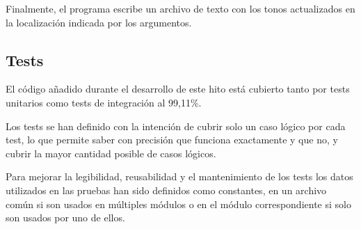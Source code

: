 Finalmente, el programa escribe un archivo de texto con los tonos actualizados en la localización indicada por los argumentos.

\subsection{Tests}

El código añadido durante el desarrollo de este hito está cubierto tanto por tests unitarios como tests de integración al 99,11\%.

Los tests se han definido con la intención de cubrir solo un caso lógico por cada test, lo que permite saber con precisión que funciona exactamente y que no, y cubrir la mayor cantidad posible de casos lógicos.

Para mejorar la legibilidad, reusabilidad y el mantenimiento de los tests los datos utilizados en las pruebas han sido definidos como constantes, en un archivo común si son usados en múltiples módulos o en el módulo correspondiente si solo son usados por uno de ellos.




